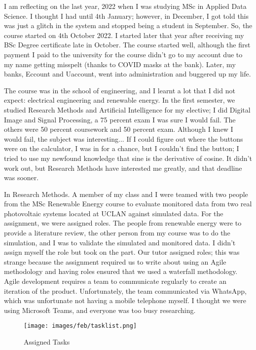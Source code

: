 \documentclass{article}
\begin{document}
I am reflecting on the last year, 2022 when I was studying MSc in Applied Data Science. I thought I had until 4th January; however, in December, I got told this was just a glitch in the system and stopped being a student in September. So, the course started on 4th October 2022. I started later that year after receiving my BSc Degree certificate late in October. The course started well, although the first payment I paid to the university for the course didn't go to my account due to my name getting misspelt (thanks to COVID masks at the bank). Later, my banks, Eccount and Uaccount, went into administration and buggered up my life.

The course was in the school of engineering, and I learnt a lot that I did not expect:  electrical engineering and renewable energy. In the first semester, we studied Research Methods and Artificial Intelligence for my elective; I did Digital Image and Signal Processing, a 75 percent exam I was sure I would fail. The others were 50 percent coursework and 50 percent exam. Although I knew I would fail, the subject was interesting...  If I could figure out where the buttons were on the calculator, I was in for a chance, but I couldn't find the button; I tried to use my newfound knowledge that sine is the derivative of cosine. It didn't work out, but Research Methods have interested me greatly, and that deadline was sooner.
 
In Research Methods. A member of my class and I were teamed with two people from the MSc Renewable Energy course to evaluate monitored data from two real photovoltaic systems located at UCLAN against simulated data. For the assignment, we were assigned roles. The people from renewable energy were to provide a literature review, the other person from my course was to do the simulation, and I was to validate the simulated and monitored data. I didn't assign myself the role but took on the part. Our tutor assigned roles; this was strange because the assignment required us to write about using an Agile methodology and having roles ensured that we used a waterfall methodology. Agile development requires a team to communicate regularly to create an iteration of the product. Unfortunately, the team communicated via WhatsApp, which was unfortunate not having a mobile telephone myself. I thought we were using Microsoft Teams, and everyone was too busy researching.

 \begin{figure}
\caption{Assigned Tasks}
\centering
\texttt{[image: images/feb/tasklist.png]}
\end{figure}
 
\end{document}
